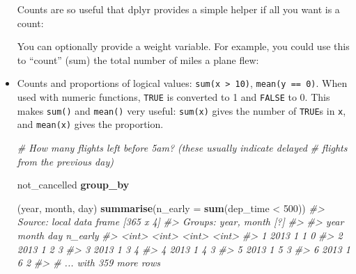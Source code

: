\documentclass[]{book}
\newenvironment{Shaded}{\begin{snugshade}}{\end{snugshade}}
\newcommand{\KeywordTok}[1]{\textcolor[rgb]{0.13,0.29,0.53}{\textbf{{#1}}}}
\newcommand{\DataTypeTok}[1]{\textcolor[rgb]{0.13,0.29,0.53}{{#1}}}
\newcommand{\DecValTok}[1]{\textcolor[rgb]{0.00,0.00,0.81}{{#1}}}
\newcommand{\StringTok}[1]{\textcolor[rgb]{0.31,0.60,0.02}{{#1}}}
\newcommand{\CommentTok}[1]{\textcolor[rgb]{0.56,0.35,0.01}{\textit{{#1}}}}
\newcommand{\NormalTok}[1]{{#1}}
\begin{document}
\begin{itemize}
  Counts are so useful that dplyr provides a simple helper if all you
  want is a count:

\begin{Shaded}
\end{Shaded}

  You can optionally provide a weight variable. For example, you could
  use this to ``count'' (sum) the total number of miles a plane flew:

\begin{Shaded}
\end{Shaded}
\item
  Counts and proportions of logical values:
  \texttt{sum(x\ \textgreater{}\ 10)}, \texttt{mean(y\ ==\ 0)}. When
  used with numeric functions, \texttt{TRUE} is converted to 1 and
  \texttt{FALSE} to 0. This makes \texttt{sum()} and \texttt{mean()}
  very useful: \texttt{sum(x)} gives the number of \texttt{TRUE}s in
  \texttt{x}, and \texttt{mean(x)} gives the proportion.

\begin{Shaded}
\begin{Highlighting}[]
\CommentTok{# How many flights left before 5am? (these usually indicate delayed}
\CommentTok{# flights from the previous day)}
\NormalTok{not_cancelled %>%}\StringTok{ }
\StringTok{  }\KeywordTok{group_by}\NormalTok{(year, month, day) %>%}\StringTok{ }
\StringTok{  }\KeywordTok{summarise}\NormalTok{(}\DataTypeTok{n_early =} \KeywordTok{sum}\NormalTok{(dep_time <}\StringTok{ }\DecValTok{500}\NormalTok{))}
\CommentTok{#> Source: local data frame [365 x 4]}
\CommentTok{#> Groups: year, month [?]}
\CommentTok{#> }
\CommentTok{#>    year month   day n_early}
\CommentTok{#>   <int> <int> <int>   <int>}
\CommentTok{#> 1  2013     1     1       0}
\CommentTok{#> 2  2013     1     2       3}
\CommentTok{#> 3  2013     1     3       4}
\CommentTok{#> 4  2013     1     4       3}
\CommentTok{#> 5  2013     1     5       3}
\CommentTok{#> 6  2013     1     6       2}
\CommentTok{#> # ... with 359 more rows}

}}
\end{Highlighting}
\end{Shaded}
\end{itemize}
\end{document}
